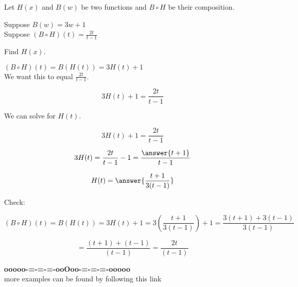 \documentclass{ximera}
\begin{document}
\begin{example}


Let $H(x)$ and $B(w)$ be two functions and $B \circ H$ be their composition.


Suppose $B(w) = 3w + 1$ \\

Suppose $(B \circ H)(t) = \frac{2t}{t-1}$


Find $H(x)$.



\begin{explanation}




$(B \circ H)(t) =  B(H(t)) = 3 H(t) + 1$ \\


We want this to equal $\frac{2t}{t-1}$.




\[
3 H(t) + 1 = \frac{2t}{t-1}
\]


We can solve for $H(t)$.



\[
3 H(t) + 1 = \frac{2t}{t-1}
\]

\[
3 H(t) = \frac{2t}{t-1} - 1 = \frac{\answer{t+1}}{t-1}
\]

\[
H(t)  = \answer{\frac{t+1}{3(t-1)}}
\]



Check:

\[
(B \circ H)(t) =  B(H(t)) = 3 H(t) + 1 = 3 \left( \frac{t+1}{3(t-1)} \right) + 1 = \frac{3(t+1) + 3(t-1)}{3(t-1)} 
\]


\[
 = \frac{(t+1) + (t-1)}{(t-1)}  = \frac{2t}{(t-1)}
\]



\end{explanation}

\end{example}

































\begin{center}
\textbf{\textcolor{green!50!black}{ooooo-=-=-=-ooOoo-=-=-=-ooooo}} \\

more examples can be found by following this link\\ 

\end{center}
\end{document}
